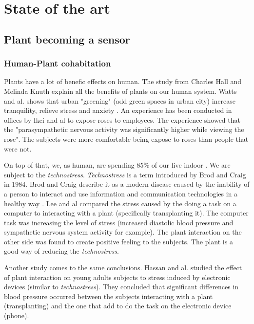 \section{State of the art}

\subsection{Plant becoming a sensor}

\subsubsection{Human-Plant cohabitation}

Plants have a lot of benefic effects on human. The study from Charles Hall and Melinda Knuth \cite{hallUpdateLiteratureSupporting2019}
explain all the benefits of plants on our human system.
Watts and al. shows that urban "greening" (add green spaces in urban city)
increase tranquility, relieve stress and anxiety \cite{wattsEffectsGreeningUrban2017}.
An experience has been conducted in offices by Ikei and al \cite{ikeiPhysiologicalPsychologicalRelaxing2014}
to expose roses to employees. The experience showed that the "parasympathetic nervous activity was significantly higher while viewing the rose".
The subjects were more comfortable
being expose to roses than people that were not.

On top of that, we, as human, are spending 85\% of our live indoor \cite{leeInteractionIndoorPlants2015}. We are subject to the
\textit{technostress}. \textit{Technostress} is a term introduced by Brod and Craig \cite{brod1984technostress} in 1984.
Brod and Craig describe it as a modern disease caused by the inability of a person to interact and use information and communication technologies
in a healthy way \cite{ayyagariTechnostressTechnologicalAntecedents2011}. Lee and al \cite{leeInteractionIndoorPlants2015} compared
the stress caused by the doing a task on a computer to interacting with a plant (specifically transplanting it).
The computer task was increasing the level of stress (increased diastolic blood pressure and sympathetic nervous system activity for example).
The plant interaction on the other side was found to create positive feeling to the subjects. The plant is a good way of reducing
the \textit{technostress}.

Another study comes to the same conclusions. Hassan and al. \cite{hassanEffectsPlantActivity2018}
studied the effect of plant interaction on young adults subjects to
stress induced by electronic devices (similar to \textit{technostress}).
They concluded that significant differences in blood pressure occurred
between the subjects interacting with a plant (transplanting) and the
one that add to do the task on the electronic device (phone).

